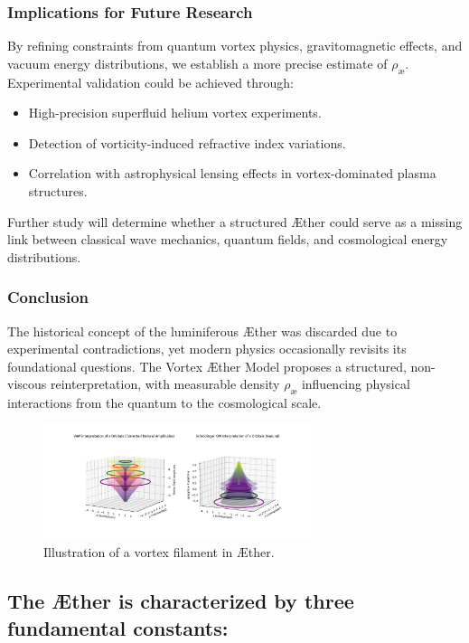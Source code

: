 \subsubsection*{Implications for Future Research}
By refining constraints from quantum vortex physics, gravitomagnetic effects, and vacuum energy distributions, we establish a more precise estimate of $ \rho_\text{\ae} $. Experimental validation could be achieved through:
\begin{itemize}
    \item High-precision superfluid helium vortex experiments.
    \item Detection of vorticity-induced refractive index variations.
    \item Correlation with astrophysical lensing effects in vortex-dominated plasma structures.
\end{itemize}
Further study will determine whether a structured Æther could serve as a missing link between classical wave mechanics, quantum fields, and cosmological energy distributions.

\subsubsection*{Conclusion}
The historical concept of the luminiferous Æther was discarded due to experimental contradictions, yet modern physics occasionally revisits its foundational questions. The Vortex Æther Model proposes a structured, non-viscous reinterpretation, with measurable density $ \rho_\text{\ae} $ influencing physical interactions from the quantum to the cosmological scale.

\begin{figure}[h]
    \centering
    \includegraphics[width=0.7\textwidth]{vortex_diagram}
    \caption{Illustration of a vortex filament in Æther.}
    \label{fig:vortex}
\end{figure}

\subsection{The Æther is characterized by three fundamental constants:}\label{subsec:the-ae-ther-is-characterized-by-three-fundamental-constants:}

